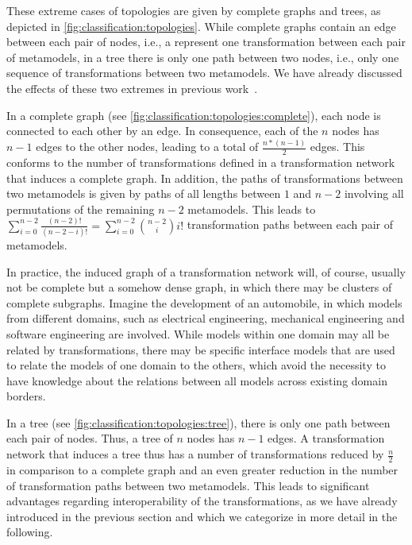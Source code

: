 These extreme cases of topologies are given by complete graphs and trees, as depicted in \autoref{fig:classification:topologies}.
While complete graphs contain an edge between each pair of nodes, i.e., a represent one transformation between each pair of metamodels, in a tree there is only one path between two nodes, i.e., only one sequence of transformations between two metamodels.
We have already discussed the effects of these two extremes in previous work~.

In a complete graph (see \autoref{fig:classification:topologies:complete}), each node is connected to each other by an edge.
In consequence, each of the $n$ nodes has $n-1$ edges to the other nodes, leading to a total of $\frac{n*(n-1)}{2}$ edges.
This conforms to the number of transformations defined in a transformation network that induces a complete graph.
In addition, the paths of transformations between two metamodels is given by paths of all lengths between $1$ and $n-2$ involving all permutations of the remaining $n-2$ metamodels.
This leads to $\sum_{i=0}^{n-2} \frac{(n-2)!}{(n-2-i)!} = \sum_{i=0}^{n-2} \binom{n-2}{i} i!$ transformation paths between each pair of metamodels.

In practice, the induced graph of a transformation network will, of course, usually not be complete but a somehow dense graph, in which there may be clusters of complete subgraphs.
Imagine the development of an automobile, in which models from different domains, such as electrical engineering, mechanical engineering and software engineering are involved. 
While models within one domain may all be related by transformations, there may be specific interface models that are used to relate the models of one domain to the others, which avoid the necessity to have knowledge about the relations between all models across existing domain borders.

In a tree (see \autoref{fig:classification:topologies:tree}), there is only one path between each pair of nodes.
Thus, a tree of $n$ nodes has $n-1$ edges.
A transformation network that induces a tree thus has a number of transformations reduced by $\frac{n}{2}$ in comparison to a complete graph and an even greater reduction in the number of transformation paths between two metamodels.
This leads to significant advantages regarding interoperability of the transformations, as we have already introduced in the previous section and which we categorize in more detail in the following.

